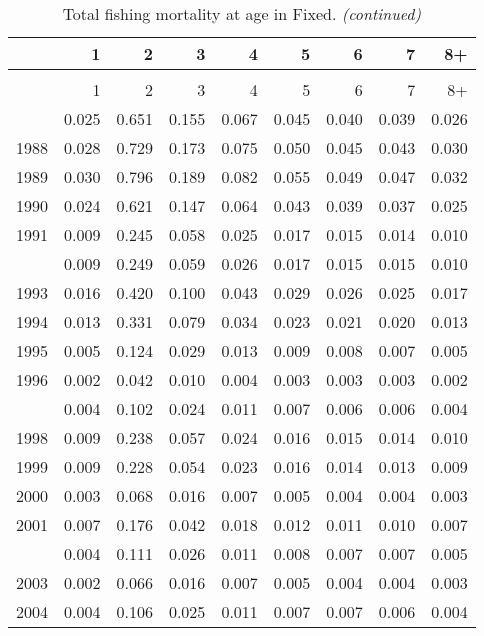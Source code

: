 \documentclass[
]{article}
\begin{document}
\begin{longtable}[t]{lrrrrrrrr}
\caption{\label{tab:Fixed-fleet-FAA-table}Total fishing mortality at age in Fixed.}\\
\toprule
  & 1 & 2 & 3 & 4 & 5 & 6 & 7 & 8+\\
\midrule
\endfirsthead
\caption[]{Total fishing mortality at age in Fixed. \textit{(continued)}}\\
\toprule
  & 1 & 2 & 3 & 4 & 5 & 6 & 7 & 8+\\
\midrule
\endhead

\endfoot
\bottomrule
\endlastfoot
1987 & 0.025 & 0.651 & 0.155 & 0.067 & 0.045 & 0.040 & 0.039 & 0.026\\
1988 & 0.028 & 0.729 & 0.173 & 0.075 & 0.050 & 0.045 & 0.043 & 0.030\\
1989 & 0.030 & 0.796 & 0.189 & 0.082 & 0.055 & 0.049 & 0.047 & 0.032\\
1990 & 0.024 & 0.621 & 0.147 & 0.064 & 0.043 & 0.039 & 0.037 & 0.025\\
1991 & 0.009 & 0.245 & 0.058 & 0.025 & 0.017 & 0.015 & 0.014 & 0.010\\
\addlinespace
1992 & 0.009 & 0.249 & 0.059 & 0.026 & 0.017 & 0.015 & 0.015 & 0.010\\
1993 & 0.016 & 0.420 & 0.100 & 0.043 & 0.029 & 0.026 & 0.025 & 0.017\\
1994 & 0.013 & 0.331 & 0.079 & 0.034 & 0.023 & 0.021 & 0.020 & 0.013\\
1995 & 0.005 & 0.124 & 0.029 & 0.013 & 0.009 & 0.008 & 0.007 & 0.005\\
1996 & 0.002 & 0.042 & 0.010 & 0.004 & 0.003 & 0.003 & 0.003 & 0.002\\
\addlinespace
1997 & 0.004 & 0.102 & 0.024 & 0.011 & 0.007 & 0.006 & 0.006 & 0.004\\
1998 & 0.009 & 0.238 & 0.057 & 0.024 & 0.016 & 0.015 & 0.014 & 0.010\\
1999 & 0.009 & 0.228 & 0.054 & 0.023 & 0.016 & 0.014 & 0.013 & 0.009\\
2000 & 0.003 & 0.068 & 0.016 & 0.007 & 0.005 & 0.004 & 0.004 & 0.003\\
2001 & 0.007 & 0.176 & 0.042 & 0.018 & 0.012 & 0.011 & 0.010 & 0.007\\
\addlinespace
2002 & 0.004 & 0.111 & 0.026 & 0.011 & 0.008 & 0.007 & 0.007 & 0.005\\
2003 & 0.002 & 0.066 & 0.016 & 0.007 & 0.005 & 0.004 & 0.004 & 0.003\\
2004 & 0.004 & 0.106 & 0.025 & 0.011 & 0.007 & 0.007 & 0.006 & 0.004\\

\end{longtable}
\end{document}
